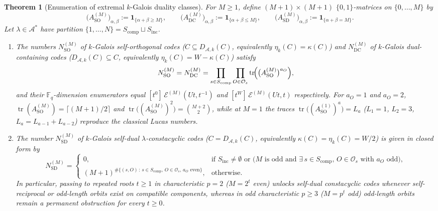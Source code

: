 \documentclass[preprint,12pt]{elsarticle}
\newcommand{\F}{\mathbb F}
\newcommand{\A}{\mathcal A}
\newcommand{\Os}{\mathcal O_s}
\newcommand{\Epoly}{\mathscr E}
\newcommand{\tr}{\operatorname{tr}}
\numberwithin{equation}{section}
\theoremstyle{plain}
\newtheorem{theorem}{Theorem}[section]
\theoremstyle{definition}
\theoremstyle{remark}
\begin{document}
\begin{theorem}[Enumeration of extremal $k$-Galois duality classes]\label{thm:extremal}
For $M\ge 1$, define $(M+1)\times(M+1)$ $\{0,1\}$-matrices on $\{0,\dots,M\}$ by
\[
\bigl(A_{\mathrm{SO}}^{(M)}\bigr)_{\alpha,\beta}:=\mathbf 1_{\{\alpha+\beta\ge M\}},
\qquad
\bigl(A_{\mathrm{DC}}^{(M)}\bigr)_{\alpha,\beta}:=\mathbf 1_{\{\alpha+\beta\le M\}},
\qquad
\bigl(A_{\mathrm{SD}}^{(M)}\bigr)_{\alpha,\beta}:=\mathbf 1_{\{\alpha+\beta=M\}}.
\]
Let $\lambda\in\A^*$ have partition $\{1,\dots,N\}=S_{\mathrm{comp}}\sqcup S_{\mathrm{inc}}$.
\begin{enumerate}
\item[\textup{(a)}] The numbers $N_{\mathrm{SO}}^{(M)}$ of $k$-Galois
self-orthogonal codes ($C\subseteq D_{\A,k}(C)$, equivalently $\eta_k(C)=\kappa(C)$)
and $N_{\mathrm{DC}}^{(M)}$ of $k$-Galois dual-containing codes
($D_{\A,k}(C)\subseteq C$, equivalently $\eta_k(C)=W-\kappa(C)$) satisfy
\begin{equation}\label{eq:SO-DC-counts}
N_{\mathrm{SO}}^{(M)}=N_{\mathrm{DC}}^{(M)}
 =\prod_{s\in S_{\mathrm{comp}}}\prod_{O\in\Os}
   \tr\!\Bigl(\bigl(A_{\mathrm{SO}}^{(M)}\bigr)^{a_O}\Bigr),
\end{equation}
and their $\F_q$-dimension enumerators equal $[t^0]\,\Epoly^{(M)}(Ut,t^{-1})$ and
$[t^W]\,\Epoly^{(M)}(Ut,t)$ respectively. For $a_O=1$ and $a_O=2$,
$\tr(A_{\mathrm{SO}}^{(M)})=\lceil(M+1)/2\rceil$ and
$\tr\bigl((A_{\mathrm{SO}}^{(M)})^2\bigr)=\binom{M+2}{2}$, while at $M=1$ the
traces $\tr\bigl((A_{\mathrm{SO}}^{(1)})^a\bigr)=L_a$ ($L_1=1$, $L_2=3$,
$L_a=L_{a-1}+L_{a-2}$) reproduce the classical Lucas numbers.
\item[\textup{(b)}] The number $N_{\mathrm{SD}}^{(M)}$ of $k$-Galois self-dual
$\lambda$-constacyclic codes ($C=D_{\A,k}(C)$, equivalently
$\kappa(C)=\eta_k(C)=W/2$) is given in closed form by
\begin{equation}\label{eq:SD-count}
N_{\mathrm{SD}}^{(M)}=
\begin{cases}
0, & \text{if }S_{\mathrm{inc}}\neq\emptyset\text{ or }
     \bigl(M\text{ is odd and }\exists\,s\in S_{\mathrm{comp}},\,O\in\Os\text{ with }a_O\text{ odd}\bigr),\\[6pt]
(M+1)^{\#\{(s,O)\,:\,s\in S_{\mathrm{comp}},\,O\in\Os,\,a_O\text{ even}\}}, & \text{otherwise}.
\end{cases}
\end{equation}
In particular, passing to repeated roots $t\ge 1$ in characteristic $p=2$ ($M=2^t$
even) unlocks self-dual constacyclic codes whenever self-reciprocal or odd-length
orbits exist on compatible components, whereas in odd characteristic $p\ge 3$
($M=p^t$ odd) odd-length orbits remain a permanent obstruction for every $t\ge 0$.
\end{enumerate}
\end{theorem}
\end{document}
